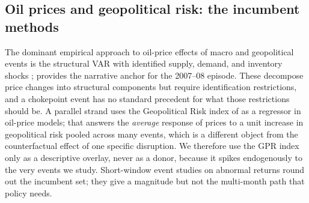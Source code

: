 \documentclass[11pt,a4paper]{article}
\begin{document}
\subsection{Oil prices and geopolitical risk: the incumbent methods}
The dominant empirical approach to oil-price effects of macro and geopolitical events
is the structural VAR with identified supply, demand, and inventory shocks
\citep{kilian2009,kilianmurphy2014,baumeisterhamilton2019}; \citet{hamilton2009}
provides the narrative anchor for the 2007--08 episode. These decompose price changes
into structural components but require identification restrictions, and a chokepoint
event has no standard precedent for what those restrictions should be. A parallel
strand uses the Geopolitical Risk index of \citet{caldara2022} as a regressor in
oil-price models; that answers the \emph{average} response of prices to a unit
increase in geopolitical risk pooled across many events, which is a different object
from the counterfactual effect of one specific disruption. We therefore use the GPR
index only as a descriptive overlay, never as a donor, because it spikes endogenously
to the very events we study. Short-window event studies on abnormal returns
\citep{brownwarner1985} round out the incumbent set; they give a magnitude but not the
multi-month path that policy needs.
\end{document}
